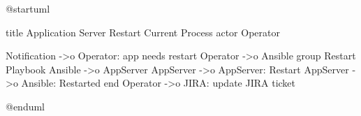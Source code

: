 @startuml

title Application Server Restart Current Process
actor Operator

Notification ->o Operator: app needs restart
Operator ->o Ansible
group Restart Playbook
  Ansible ->o AppServer
  AppServer ->o AppServer: Restart
  AppServer ->o Ansible: Restarted
end
Operator ->o JIRA: update JIRA ticket

@enduml
